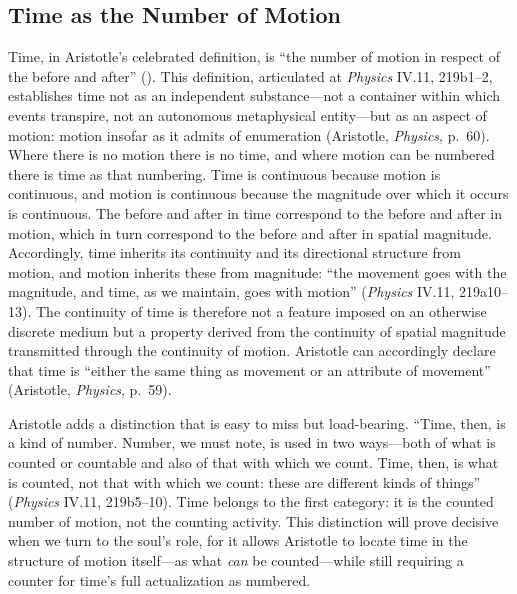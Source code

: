 \subsection*{Time as the Number of Motion}

Time, in Aristotle's celebrated definition, is ``the number of motion in respect of the before and after'' (). This definition, articulated at \textit{Physics} IV.11, 219b1--2, establishes time not as an independent substance---not a container within which events transpire, not an autonomous metaphysical entity---but as an aspect of motion: motion insofar as it admits of enumeration (Aristotle, \textit{Physics}, p.~60). Where there is no motion there is no time, and where motion can be numbered there is time as that numbering. Time is continuous because motion is continuous, and motion is continuous because the magnitude over which it occurs is continuous. The before and after in time correspond to the before and after in motion, which in turn correspond to the before and after in spatial magnitude. Accordingly, time inherits its continuity and its directional structure from motion, and motion inherits these from magnitude: ``the movement goes with the magnitude, and time, as we maintain, goes with motion'' (\textit{Physics} IV.11, 219a10--13). The continuity of time is therefore not a feature imposed on an otherwise discrete medium but a property derived from the continuity of spatial magnitude transmitted through the continuity of motion. Aristotle can accordingly declare that time is ``either the same thing as movement or an attribute of movement'' (Aristotle, \textit{Physics}, p.~59).

Aristotle adds a distinction that is easy to miss but load-bearing. ``Time, then, is a kind of number. Number, we must note, is used in two ways---both of what is counted or countable and also of that with which we count. Time, then, is what is counted, not that with which we count: these are different kinds of things'' (\textit{Physics} IV.11, 219b5--10). Time belongs to the first category: it is the counted number of motion, not the counting activity. This distinction will prove decisive when we turn to the soul's role, for it allows Aristotle to locate time in the structure of motion itself---as what \textit{can} be counted---while still requiring a counter for time's full actualization as numbered.

